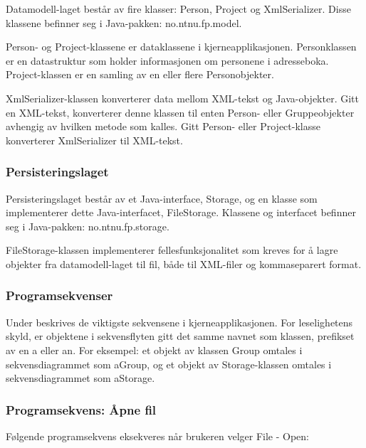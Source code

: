 Datamodell-laget består av fire klasser: Person, Project og XmlSerializer.  Disse klassene befinner seg i Java-pakken: no.ntnu.fp.model.

Person- og Project-klassene er dataklassene i kjerneapplikasjonen. Personklassen er en datastruktur som holder informasjonen om personene i adresseboka. Project-klassen er en samling av en eller flere Personobjekter.

XmlSerializer-klassen konverterer data mellom XML-tekst og Java-objekter. Gitt en XML-tekst, konverterer denne klassen til enten Person- eller Gruppeobjekter avhengig av hvilken metode som kalles. Gitt Person- eller Project-klasse konverterer XmlSerializer til XML-tekst. 

\subsubsection{Persisteringslaget}

Persisteringslaget består av et Java-interface, Storage, og en klasse som implementerer dette Java-interfacet, FileStorage. Klassene og interfacet befinner seg i Java-pakken: no.ntnu.fp.storage.

FileStorage-klassen implementerer fellesfunksjonalitet som kreves for å lagre objekter fra datamodell-laget til fil, både til XML-filer og kommaseparert format.

\subsubsection{Programsekvenser}

Under beskrives de viktigste sekvensene i kjerneapplikasjonen. For leselighetens skyld, er objektene i sekvensflyten gitt det samme navnet som klassen, prefikset av en a eller an. For eksempel: et objekt av klassen Group omtales i sekvensdiagrammet som aGroup, og et objekt av Storage-klassen omtales i sekvensdiagrammet som aStorage.


\subsubsection{Programsekvens: Åpne fil}

Følgende programsekvens eksekveres når brukeren velger File - Open:

